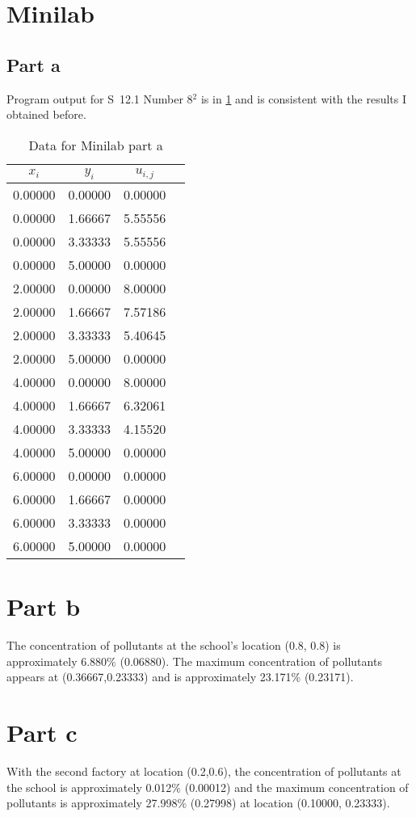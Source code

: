 \documentclass[12pt]{article}
\begin{document}
\section{Minilab}
\subsection{Part a}
Program output for S~12.1 Number 8$^2$ is in \cref{tab:mini_a} and is
consistent with the results I obtained before.
\begin{table}[h]
  \centering
  \begin{tabular}{cccc}
    \hline
    $x_i$ & $y_i$ & $u_{i,j}$ \\
    \hline
    0.00000 & 0.00000 & 0.00000 \\
    0.00000 & 1.66667 & 5.55556 \\
    0.00000 & 3.33333 & 5.55556 \\
    0.00000 & 5.00000 & 0.00000 \\
    2.00000 & 0.00000 & 8.00000 \\
    2.00000 & 1.66667 & 7.57186 \\
    2.00000 & 3.33333 & 5.40645 \\
    2.00000 & 5.00000 & 0.00000 \\
    4.00000 & 0.00000 & 8.00000 \\
    4.00000 & 1.66667 & 6.32061 \\
    4.00000 & 3.33333 & 4.15520 \\
    4.00000 & 5.00000 & 0.00000 \\
    6.00000 & 0.00000 & 0.00000 \\
    6.00000 & 1.66667 & 0.00000 \\
    6.00000 & 3.33333 & 0.00000 \\
    6.00000 & 5.00000 & 0.00000 \\
    \hline
  \end{tabular}
  \caption{Data for Minilab part a}
\label{tab:mini_a}
\end{table}

\section{Part b}
The concentration of pollutants at the school's location (0.8, 0.8)
is approximately 6.880\% (0.06880). The maximum concentration of
pollutants appears at (0.36667,0.23333) and is approximately 23.171\%
(0.23171). 
\section{Part c}
With the second factory at location (0.2,0.6), the concentration of
pollutants at the school is approximately 0.012\% (0.00012) and the
maximum concentration of pollutants is approximately 27.998\%
(0.27998) at location (0.10000, 0.23333).
\end{document}
